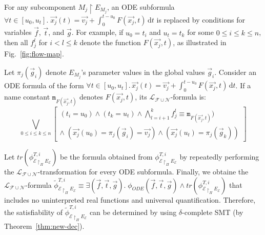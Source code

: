 For any subcomponent $M_j \restriction E_{M_j}$,
an ODE subformula $\forall t \in [u_0,u_t].\; \vec{x_j}(t) = \vec{v_j} + \int_0^{t-u_0} \!  F(\vec{x_j},t)\,\mathrm{d}t$ 
is replaced by conditions for variables  $\vec{f}$, $\vec{t}$, and $\vec{g}$.
For example, if $u_0 = t_i$ and $u_t = t_k$ for some $0 \leq i \leq k \leq n$,
then all $f_j^l$ for $i < l \leq k$ 
denote
the function $F(\vec{x_j},t)$,
as illustrated in Fig.~\ref{fig:flow-map}.


\begin{definition}\label{def:ode-trans}
Let  $\pi_j(\vec{g}_i)$ denote $E_{M_j}$'s parameter values 
in the global values $\vec{g}_i$. %
Consider an ODE formula %
of the form 
$\forall t \in [u_0,u_t].\, \vec{x_j}(t) = \vec{v_j} + \int_0^{t-u_0} \!  F(\vec{x_j},t)\,\mathrm{d}t$.
If a name constant $\mathtt{m}_{F(\vec{x_j},t)}$ denotes $F(\vec{x_j},t)$,
its $\mathcal{L}_{\mathcal{F}\cup\mathcal{N}}$-formula is: %
\[
\bigvee_{0 \leq i \leq k \leq n} 
\left[
\begin{aligned}
(t_i = u_0) \wedge (t_k = u_t) \wedge \textstyle\bigwedge_{l=i+1}^{k} f^l_j \equiv \mathtt{m}_{F(\vec{x_j},t)}  )
\\
\wedge\; (\vec{x_j}(u_0) = \pi_j(\vec{g}_i) = \vec{v_j}) \wedge  (\vec{x_j}(u_t) = \pi_j(\vec{g}_k))
\end{aligned}
\right]
\]
\end{definition}

Let $\mathit{tr}(\phi_{\mathcal{E} \restriction_{\Pi} E_\mathcal{E}}^{T,i})$ 
be the formula
obtained from $\phi_{\mathcal{E} \restriction_{\Pi} E_\mathcal{E}}^{T,i}$ 
by repeatedly performing the $\mathcal{L}_{\mathcal{F}\cup\mathcal{N}}$-transformation
for every ODE subformula.
Finally, we obtaine the $\mathcal{L}_{\mathcal{F}\cup\mathcal{N}}$-formula 
$\tilde{\phi}_{\mathcal{E} \restriction_{\Pi} E_\mathcal{E}}^{T,i}
\equiv
\exists (\vec{f}, \vec{t}, \vec{g}).\; \phi_{\mathit{ODE}}(\vec{f},\vec{t},\vec{g}) \wedge \mathit{tr}(\phi_{\mathcal{E} \restriction_{\Pi} E_\mathcal{E}}^{T,i})$
that includes no uninterpreted real functions and universal quantification.
Therefore, the  satisfiability of $\tilde{\phi}_{\mathcal{E} \restriction_{\Pi} E_\mathcal{E}}^{T,i}$ can be determined by using
$\delta$-complete SMT (by Theorem~\ref{thm:new-dec}).


